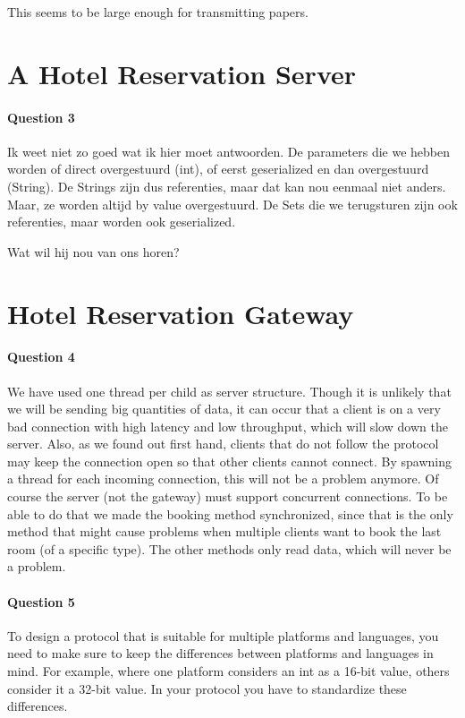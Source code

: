 \documentclass[a4paper,10pt]{article}
\begin{document}
This seems to be large enough for transmitting papers.


\section{A Hotel Reservation Server}
\paragraph{Question 3}
Ik weet niet zo goed wat ik hier moet antwoorden. De parameters die we hebben worden of direct overgestuurd (int), of eerst geserialized en dan overgestuurd (String). De Strings zijn dus referenties, maar dat kan nou eenmaal niet anders. Maar, ze worden altijd by value overgestuurd. De Sets die we terugsturen zijn ook referenties, maar worden ook geserialized.

Wat wil hij nou van ons horen?

\section{Hotel Reservation Gateway}
\paragraph{Question 4}
We have used one thread per child as server structure. Though it is unlikely that we will be sending big quantities of data, it can occur that a client is on a very bad connection with high latency and low throughput, which will slow down the server. Also, as we found out first hand, clients that do not follow the protocol may keep the connection open so that other clients cannot connect. By spawning a thread for each incoming connection, this will not be a problem anymore. Of course the server (not the gateway) must support concurrent connections. To be able to do that we made the booking method synchronized, since that is the only method that might cause problems when multiple clients want to book the last room (of a specific type). The other methods only read data, which will never be a problem.

\paragraph{Question 5}
To design a protocol that is suitable for multiple platforms and languages, you need to make sure to keep the differences between platforms and languages in mind. For example, where one platform considers an int as a 16-bit value, others consider it a 32-bit value. In your protocol you have to standardize these differences.
\end{document}
